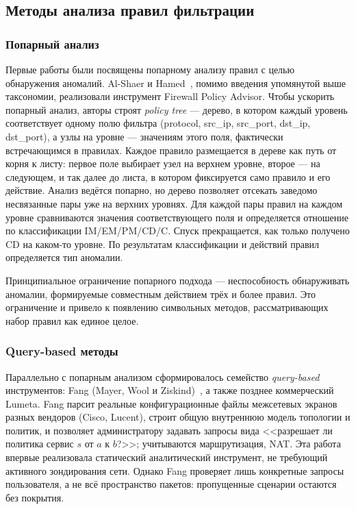 \subsection{Методы анализа правил фильтрации}
\label{sec:Section2:methods}

\subsubsection{Попарный анализ}
\label{sec:Section2:pairwise}

Первые работы были посвящены попарному анализу правил с целью обнаружения аномалий. Al-Shaer и Hamed~\cite{al2003firewall}, помимо введения упомянутой выше таксономии, реализовали инструмент Firewall Policy Advisor. Чтобы ускорить попарный анализ, авторы строят \emph{policy tree} --- дерево, в котором каждый уровень соответствует одному полю фильтра (protocol, src\_ip, src\_port, dst\_ip, dst\_port), а узлы на уровне --- значениям этого поля, фактически встречающимся в правилах. Каждое правило размещается в дереве как путь от корня к листу: первое поле выбирает узел на верхнем уровне, второе --- на следующем, и так далее до листа, в котором фиксируется само правило и его действие. Анализ ведётся попарно, но дерево позволяет отсекать заведомо несвязанные пары уже на верхних уровнях. Для каждой пары правил на каждом уровне сравниваются значения соответствующего поля и определяется отношение по классификации IM/EM/PM/CD/C. Спуск прекращается, как только получено CD на каком-то уровне. По результатам классификации и действий правил определяется тип аномалии.

Принципиальное ограничение попарного подхода --- неспособность обнаруживать аномалии, формируемые совместным действием трёх и более правил. Это ограничение и привело к появлению символьных методов, рассматривающих набор правил как единое целое.

\subsubsection{Query-based методы}
\label{sec:Section2:querybased}

Параллельно с попарным анализом сформировалось семейство \emph{query-based} инструментов: Fang (Mayer, Wool и Ziskind)~\cite{mayer2000fang}, а также позднее коммерческий Lumeta. Fang парсит реальные конфигурационные файлы межсетевых экранов разных вендоров (Cisco, Lucent), строит общую внутреннюю модель топологии и политик, и позволяет администратору задавать запросы вида <<разрешает ли политика сервис $s$ от $a$ к $b$?>>; учитываются маршрутизация, NAT. Эта работа впервые реализовала статический аналитический инструмент, не требующий активного зондирования сети. Однако Fang проверяет лишь конкретные запросы пользователя, а не всё пространство пакетов: пропущенные сценарии остаются без покрытия.


